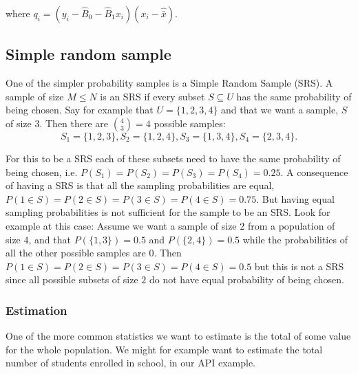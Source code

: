 \documentclass{article}
\begin{document}
where \(q_i = (y_i - \hat{B}_0 - \hat{B}_1 x_i)(x_i - \hat{\bar{x}})\).

\subsection{Simple random sample} \label{sec:SRS}

One of the simpler probability samples is a Simple Random Sample (SRS). A
sample of size \(M \leq N\) is an SRS if every subset \(S \subseteq U\) has the same
probability of being chosen.
Say for example that \(U = \{1, 2, 3, 4\}\) and that we want a sample, \(S\) of
size \(3\). Then there are \(\binom{4}{3} = 4\)  possible samples:
\begin{equation*}
 S_1 = \{1, 2, 3\}, 
 S_2 = \{1, 2, 4\}, 
 S_3 = \{1, 3, 4\}, 
 S_4 = \{2, 3, 4\} .
 \end{equation*}


For this to be a SRS each of these subsets need to have the same probability of
being chosen, i.e. \(P(S_1) = P(S_2) = P(S_3) = P(S_4) = 0.25\). A consequence of
having a SRS is that all the sampling probabilities are equal, \(P(1 \in S) =
P(2 \in S) = P(3 \in S) = P(4 \in S) = 0.75\). But having equal sampling
probabilities is not sufficient for the sample to be an SRS.
Look for example at this case:
Assume we want a sample of size \(2\) from a population of size \(4\), and that
\(P(\{1, 3\}) = 0.5\) and \(P(\{2, 4\}) = 0.5\) while the probabilities of all the
other possible samples are \(0\). Then \(P(1 \in S) = P(2 \in S) = P(3 \in S) = P(4 \in S) = 0.5\)
but this is not a SRS since all possible subsets of size \(2\) do not have equal
probability of being chosen.


\subsubsection{Estimation}

One of the more common statistics we want to estimate is the total of some value
for the whole population. We might for example want to estimate the total number
of students enrolled in school, in our API example.
\end{document}
